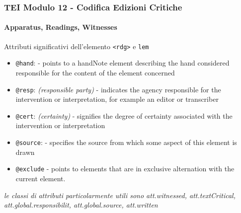 \begin{frame}
    \frametitle{TEI Modulo 12 - Codifica Edizioni Critiche}
    \framesubtitle{Apparatus, Readings, Witnesses}
    \addtocounter{nframe}{1}

      
    \begin{block}{Attributi significativi dell'elemento \texttt{<rdg>} e \texttt{lem}}
        \begin{itemize}
            \item \texttt{@hand}: \textit{} - points to a handNote element describing the hand considered responsible for the content of the element concerned
            \item \texttt{@resp}: \textit{(responsible party)} - indicates the agency responsible for the intervention or interpretation, for example an editor or transcriber
            \item \texttt{@cert}: \textit{(certainty)} - signifies the degree of certainty associated with the intervention or interpretation
            \item \texttt{@source}: \textit{} - specifies the source from which some aspect of this element is drawn
            \item \texttt{@exclude}	\textit{} - points to elements that are in exclusive alternation with the current element.
        \end{itemize}
    \end{block}

    \textit{le classi di attributi particolarmente utili sono att.witnessed, att.textCritical, att.global.responsibilit, att.global.source, att.written}


\end{frame}


